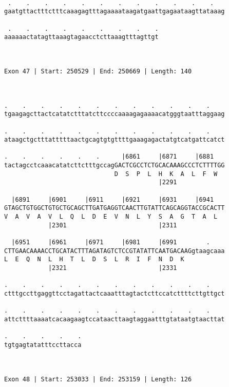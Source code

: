 \documentclass{article}
\begin{document}
\begin{Verbatim}
  
 .    .    .    .    .    .    .    .    .    .    .    .   
gaatgttactttctttcaaagagtttagaaaataagatgaattgagaataagttataaag
                                                            
 .    .    .    .    .    .    .    .    .
aaaaaactatagttaaagtagaacctcttaaagtttagttgt
                                          
                                          
 
Exon 47 | Start: 250529 | End: 250669 | Length: 140



.    .    .    .    .    .    .    .    .    .    .    .    
tgaagagcttactcatatctttatcttccccaaaagagaaaacatgggtaatttaggaag
                                                            
.    .    .    .    .    .    .    .    .    .    .    .    
ataagctgctttatttttaactgcagtgtgttttgaaagagactatgtcatgattcatct
                                                            
.    .    .    .    .    .      |6861     |6871     |6881   
tactagcctcaaacatatcttctttgccagGACTCGCCTCTGCACAAAGCCCTCTTTTGG
                              D  S  P  L  H  K  A  L  F  W  
                                          |2291             
  
  |6891     |6901     |6911     |6921     |6931     |6941   
GTAGCTGTGGCTGTGCTGCAGCTTGATGAGGTCAACTTGTATTCAGCAGGTACCGCACTT
V  A  V  A  V  L  Q  L  D  E  V  N  L  Y  S  A  G  T  A  L  
            |2301                         |2311             
  
  |6951     |6961     |6971     |6981     |6991        .    
CTTGAACAAAACCTGCATACTTTAGATAGTCTCCGTATATTCAATGACAAGgtaagcaaa
L  E  Q  N  L  H  T  L  D  S  L  R  I  F  N  D  K           
            |2321                         |2331             
  
.    .    .    .    .    .    .    .    .    .    .    .    
ctttgccttgaggttcctagattactcaaatttagtactcttccatcttttcttgttgct
                                                            
.    .    .    .    .    .    .    .    .    .    .    .    
attcttttaaaatcacaagaagtccataacttaagtaggaatttgtataatgtaacttat
                                                            
.    .    .    .    .
tgtgagtatatttccttacca
                     
                     
 
Exon 48 | Start: 253033 | End: 253159 | Length: 126




\end{Verbatim}
\end{document}

